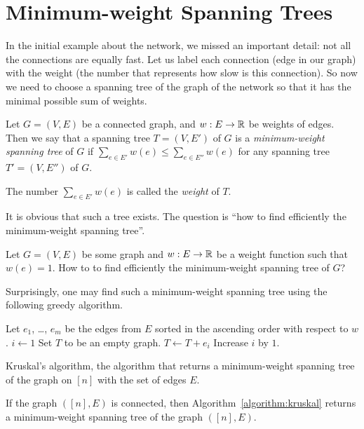 \section{Minimum-weight Spanning Trees}
In the initial example about the network, we missed an important detail: not
all the connections are equally fast. Let us label each connection
(edge in our graph) with the weight (the number that represents how slow is this
connection). So now we need to choose a spanning tree of
the graph of the network so that it has the minimal possible sum of weights.
\begin{definition}
  Let $G = (V, E)$ be a connected graph, and $w : E \to \mathbb{R}$ be weights of edges.
  Then we say that a spanning tree $T = (V, E')$ of $G$ is a
  \emph{minimum-weight spanning tree} of $G$ if
  $\sum_{e \in E'} w(e) \le \sum_{e \in E''} w(e)$ for any spanning tree
  $T' = (V, E'')$ of $G$.

  The number $\sum_{e \in E'} w(e)$ is called the \emph{weight} of $T$.
\end{definition}

It is obvious that such a tree exists. The question is
``how to find efficiently the minimum-weight spanning tree''.
\begin{exercise}
  Let $G = (V, E)$ be some graph and $w : E \to \mathbb{R}$ be a weight function such
  that $w(e) = 1$. How to to find efficiently the minimum-weight spanning tree
  of $G$?
\end{exercise}


Surprisingly, one may find such a minimum-weight spanning tree using the
following greedy algorithm.
\begin{algorithm}
  \begin{algorithmic}[1]
      \State Let $e_1$, \dots, $e_m$ be the edges from $E$ sorted in the
        ascending order with respect to $w$.
      \State $i \gets 1$
      \State Set $T$ to be an empty graph.
          \State $T \gets T + e_i$
        \EndIf
        \State Increase $i$ by $1$.
      \EndWhile
      \State {}
    \EndFunction
  \end{algorithmic}
  \caption{Kruskal's algorithm, the algorithm that returns a minimum-weight
  spanning tree of the graph on $[n]$ with the set of edges $E$.}
  \label{algorithm:kruskal}
\end{algorithm}

\begin{theorem}
  If the graph $([n], E)$ is connected, then Algorithm~\ref{algorithm:kruskal}
  returns a minimum-weight spanning tree of the graph $([n], E)$.
\end{theorem}
